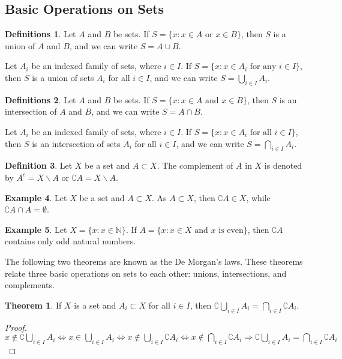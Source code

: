 \documentclass[12pt,a4paper]{article}
\theoremstyle{definition}
\newtheorem{defn}{Definition}[section]
\newtheorem{defns}[defn]{Definitions}
\newtheorem{example}[defn]{Example}
\newtheorem{thm}{Theorem}[section]
\begin{document}
\subsection{Basic Operations on Sets}
\begin{defns}
Let $A$ and $B$ be sets. If $S = \{ x : x \in A \text{ or } x \in B \}$, then
$S$ is a union of $A$ and $B$, and we can write $S = A \cup B$.

Let $A_i$ be an indexed family of sets, where $i \in I$. If $S = \{ x : x \in
A_i \text{ for any } i \in I\}$, then $S$ is a union of sets $A_i$ for all $i
\in I$, and we can write $S = \bigcup_{i \in I} A_i$.  
\end{defns}

\begin{defns}
Let $A$ and $B$ be sets. If $S = \{ x : x \in A \text{ and } x \in B \}$, then
$S$ is an intersection of $A$ and $B$, and we can write $S = A \cap B$.

Let $A_i$ be an indexed family of sets, where $i \in I$. If $S = \{ x : x \in
A_i \text{ for all } i \in I\}$, then $S$ is an intersection of sets $A_i$ for
all $i \in I$, and we can write $S = \bigcap_{i \in I} A_i$.  
\end{defns}

\begin{defn}
Let $X$ be a set and $A \subset X$. The complement of $A$ in $X$ is denoted by
$A^c = X \backslash A$ or $\complement A = X \backslash A$. 
\end{defn}

\begin{example}
Let $X$ be a set and $A \subset X$. As $A \subset X$, then $\complement A \in
X$, while $\complement A \cap A = \emptyset$.
\end{example}

\begin{example}
Let $X = \{ x : x \in \mathbb{N} \}$. If $A = \{ x : x \in X \text{ and } x
\text{ is even} \}$, then $\complement A$ contains only odd natural numbers.
\end{example}

The following two theorems are known as the De Morgan's laws. These theorems
relate three basic operations on sets to each other: unions, intersections, and
complements.

\begin{thm}
If $X$ is a set and $A_i \subset X$ for all $i \in I$, then $\complement
\bigcup_{i \in I} A_i = \bigcap_{i \in I} \complement A_i$.
\begin{proof}
$x \notin \complement \bigcup_{i \in I} A_i \Leftrightarrow x \in \bigcup_{i
\in I} A_i \Leftrightarrow x \notin \bigcup_{i \in I} \complement A_i
\Leftrightarrow x \notin \bigcap_{i \in I} \complement A_i \Rightarrow
\complement \bigcup_{i \in I} A_i = \bigcap_{i \in I} \complement A_i$
\end{proof}
\end{thm}
\end{document}
